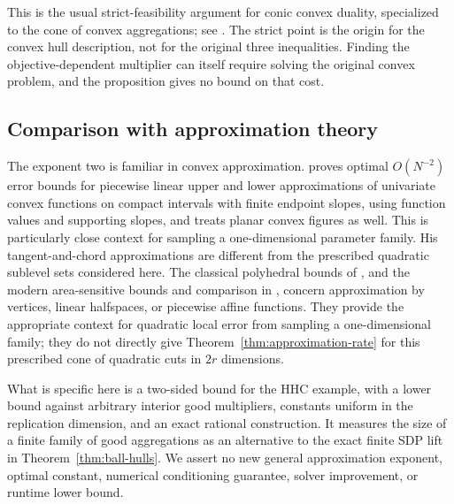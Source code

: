 This is the usual strict-feasibility argument for conic convex duality,
specialized to the cone of convex aggregations; see
\citet[Section~5.9]{BoydVandenberghe2004}. The strict point is the
origin for the convex hull description, not for the original three
inequalities. Finding the objective-dependent multiplier can itself
require solving the original convex problem, and the proposition gives
no bound on that cost.

\subsection{Comparison with approximation theory}

The exponent two is familiar in convex approximation.
\citet{Rote1992} proves optimal $O(N^{-2})$ error bounds for
piecewise linear upper and lower approximations of univariate convex
functions on compact intervals with finite endpoint slopes, using
function values and supporting slopes, and treats
planar convex figures as well. This is particularly close context for
sampling a one-dimensional parameter family. His tangent-and-chord
approximations are different from the prescribed quadratic sublevel
sets considered here. The classical
polyhedral bounds of \citet{BronshteynIvanov1975}, and the modern
area-sensitive bounds and comparison in \citet[Section~1 and
Theorems~1--2]{AryaFonsecaMount2025}, concern approximation by vertices,
linear halfspaces, or piecewise affine functions. They provide the
appropriate context for quadratic local error from sampling a
one-dimensional family; they do not directly give
Theorem~\ref{thm:approximation-rate} for this prescribed cone of
quadratic cuts in $2r$ dimensions.

What is specific here is a two-sided bound for the HHC example, with a
lower bound against arbitrary interior good multipliers, constants
uniform in the replication dimension, and an exact rational
construction. It measures the size of a finite family of good
aggregations as an alternative to the exact finite SDP lift in
Theorem~\ref{thm:ball-hulls}. We assert no new general approximation
exponent, optimal constant, numerical conditioning guarantee, solver
improvement, or runtime lower bound.
